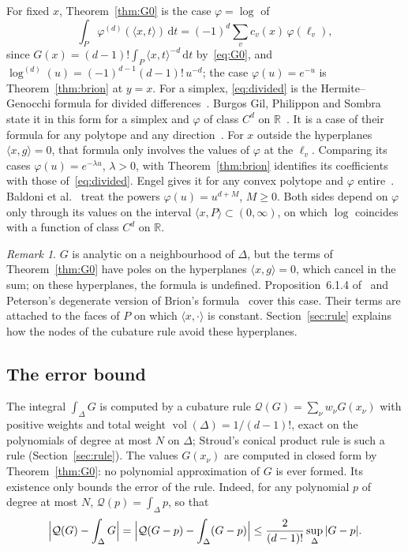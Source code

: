\documentclass[11pt]{article}
\theoremstyle{remark}
\newtheorem{remark}[theorem]{Remark}
\newcommand{\R}{\mathbb{R}}
\newcommand{\scal}[2]{\langle #1, #2\rangle}
\newcommand{\vol}{\operatorname{vol}}
\newcommand{\dd}{\mathrm{d}}
\begin{document}
For fixed $x$, Theorem~\ref{thm:G0} is the case $\varphi = \log$ of
\begin{equation}\label{eq:divided}
  \int_P \varphi^{(d)}(\scal{x}{t}) \, \dd t
  = (-1)^d \sum_v c_v(x) \, \varphi(\ell_v),
\end{equation}
since $G(x) = (d-1)! \int_P \scal{x}{t}^{-d} \, \dd t$ by~\eqref{eq:G0},
and $\log^{(d)}(u) = (-1)^{d-1} (d-1)! \, u^{-d}$; the case $\varphi(u) =
e^{-u}$ is Theorem~\ref{thm:brion} at $y = x$. For a simplex,
\eqref{eq:divided} is the Hermite--Genocchi formula for divided
differences~\cite{deBoor}. Burgos Gil, Philippon and Sombra state it in this
form for a simplex and $\varphi$ of class $C^d$ on
$\R$~\cite[Corollary~6.1.10]{BGPS}. It is a case of their formula for any
polytope and any direction~\cite[Proposition~6.1.4]{BGPS}. For $x$ outside
the hyperplanes $\scal{x}{g} = 0$, that formula only involves the values of
$\varphi$ at the $\ell_v$. Comparing its cases $\varphi(u) = e^{-\lambda
u}$, $\lambda > 0$, with Theorem~\ref{thm:brion} identifies its coefficients
with those of~\eqref{eq:divided}. Engel gives it for any convex polytope and
$\varphi$ entire~\cite[Corollary~4.1]{Engel}. Baldoni et
al.~\cite{BaldoniEtAl} treat the powers $\varphi(u) = u^{d+M}$, $M \geq 0$.
Both sides depend on $\varphi$ only through its values on the interval
$\scal{x}{P} \subset (0, \infty)$, on which $\log$ coincides with a function
of class $C^d$ on $\R$.

\begin{remark}\label{rem:singular}
$G$ is analytic on a neighbourhood of $\Delta$, but the terms of
Theorem~\ref{thm:G0} have poles on the hyperplanes $\scal{x}{g} = 0$, which
cancel in the sum; on these hyperplanes, the formula is undefined.
Proposition~6.1.4 of~\cite{BGPS} and Peterson's degenerate version of
Brion's formula~\cite{Peterson} cover this case. Their terms are attached to
the faces of $P$ on which $\scal{x}{\cdot}$ is constant.
Section~\ref{sec:rule} explains how the nodes of the cubature rule avoid
these hyperplanes.
\end{remark}

\subsection{The error bound}
\label{sec:approximation}

The integral $\int_\Delta G$ is computed by a cubature rule
$\mathcal{Q}(G) = \sum_\nu w_\nu G(x_\nu)$ with positive weights and total
weight $\vol(\Delta) = 1/(d-1)!$, exact on the polynomials of degree at most
$N$ on $\Delta$; Stroud's conical product rule is such a rule
(Section~\ref{sec:rule}). The values $G(x_\nu)$ are computed in closed form
by Theorem~\ref{thm:G0}: no polynomial approximation of $G$ is ever formed.
Its existence only bounds the error of the rule. Indeed, for any polynomial
$p$ of degree at most $N$, $\mathcal{Q}(p) = \int_\Delta p$, so that
\begin{equation}\label{eq:positive}
  \Bigl| \mathcal{Q}(G) - \int_\Delta G \Bigr|
  = \Bigl| \mathcal{Q}(G - p) - \int_\Delta (G - p) \Bigr|
  \leq \frac{2}{(d-1)!} \sup_\Delta |G - p|.
\end{equation}
\end{document}
